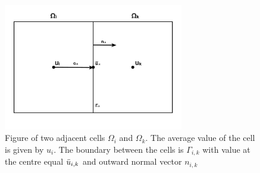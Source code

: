 \begin{figure}[H]
    \centering
    \includegraphics[width = 0.7\textwidth]{figures/grid_two_cells.pdf}
    \caption{Figure of two adjacent cells $\Omega_i$ and $\Omega_k$. The average value of the cell is given by $u_i$. The boundary between the cells is $\Gamma_{i,k}$ with value at the centre equal $\Bar{u}_{i,k}$ and outward normal vector $n_{i,k}$}
    \label{fig:gridTwoCells}
\end{figure}

